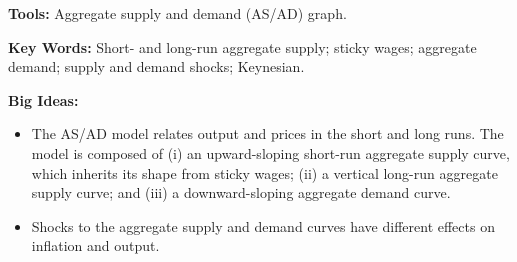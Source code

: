 \textbf{Tools:} Aggregate supply and demand (AS/AD) graph.

\textbf{Key Words:} Short- and   long-run aggregate supply; sticky wages; aggregate demand; supply and demand shocks; Keynesian.

\textbf{Big Ideas:}
\begin{itemize}
    \item The AS/AD model relates output and prices in the short and long runs. The model is composed of (i) an upward-sloping short-run aggregate supply curve, which inherits its shape from sticky wages; (ii) a vertical long-run aggregate supply curve; and (iii) a downward-sloping aggregate demand curve.
    \item Shocks to the aggregate supply and demand curves have different effects on inflation and output.
\end{itemize}
